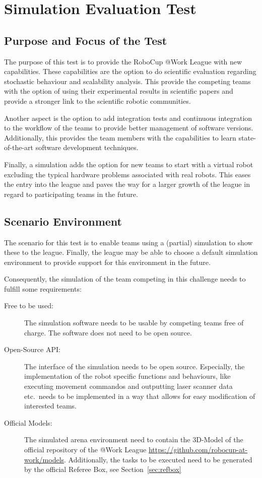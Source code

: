 \newpage
\section{Simulation Evaluation Test}

\subsection{Purpose and Focus of the Test}

The purpose of this test is to provide the RoboCup @Work League with new capabilities. These capabilities are the option to do scientific evaluation regarding stochastic behaviour and scalability analysis. This provide the competing teams with the option of using their experimental results in scientific papers and provide a stronger link to the scientific robotic communities.

Another aspect is the option to add integration tests and continuous integration to the workflow of the teams to provide better management of software versions. Additionally, this provides the team members with the capabilities to learn state-of-the-art software development techniques.

Finally, a simulation adds the option for new teams to start with a virtual robot excluding the typical hardware problems associated with real robots. This eases the entry into the league and paves the way for a larger growth of the league in regard to participating teams in the future. 

\subsection{Scenario Environment}

The scenario for this test is to enable teams using a (partial) simulation to show these to the league. Finally, the league may be able to choose a default simulation environment to provide support for this environment in the future. 

Consequently, the simulation of the team competing in this challenge needs to fulfill some requirements:

\begin{description}
  \item[Free to be used:] The simulation software needs to be usable by competing teams free of charge. The software does not need to be open source.
  \item[Open-Source API:] The interface of the simulation needs to be open source. Especially, the implementation of the robot specific functions and behaviours, like executing movement commandos and outputting laser scanner data etc.\ needs to be implemented in a way that allows for easy modification of interested teams.
  \item[Official Models:] The simulated arena environment need to contain the 3D-Model of the official repository of the @Work League \url{https://github.com/robocup-at-work/models}. Additionally, the tasks to be executed need to be generated by the official Referee Box, see Section~\ref{sec:refbox}
\end{description}

